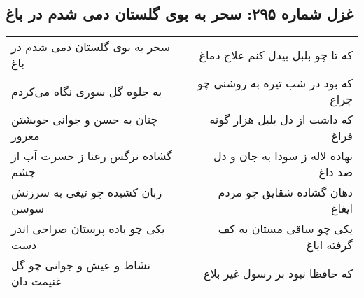 \begin{center}
\section*{غزل شماره ۲۹۵: سحر به بوی گلستان دمی شدم در باغ}
\label{sec:sh295}
\begin{longtable}{l p{0.5cm} r}
سحر به بوی گلستان دمی شدم در باغ
&&
که تا چو بلبل بیدل کنم علاج دماغ
\\
به جلوه گل سوری نگاه می‌کردم
&&
که بود در شب تیره به روشنی چو چراغ
\\
چنان به حسن و جوانی خویشتن مغرور
&&
که داشت از دل بلبل هزار گونه فراغ
\\
گشاده نرگس رعنا ز حسرت آب از چشم
&&
نهاده لاله ز سودا به جان و دل صد داغ
\\
زبان کشیده چو تیغی به سرزنش سوسن
&&
دهان گشاده شقایق چو مردم ایغاغ
\\
یکی چو باده پرستان صراحی اندر دست
&&
یکی چو ساقی مستان به کف گرفته ایاغ
\\
نشاط و عیش و جوانی چو گل غنیمت دان
&&
که حافظا نبود بر رسول غیر بلاغ
\\
\end{longtable}
\end{center}
